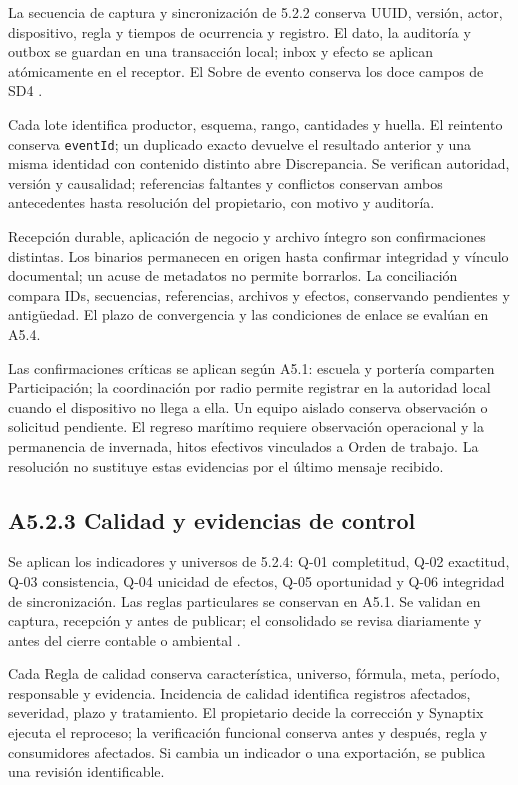 La secuencia de captura y sincronización de 5.2.2 conserva UUID, versión, actor, dispositivo, regla y tiempos de ocurrencia y registro. El dato, la auditoría y outbox se guardan en una transacción local; inbox y efecto se aplican atómicamente en el receptor. El Sobre de evento conserva los doce campos de SD4 \parencites[RT-05.03]{pucv-bases-transversales}{synaptix-sd4}.

Cada lote identifica productor, esquema, rango, cantidades y huella. El reintento conserva \texttt{eventId}; un duplicado exacto devuelve el resultado anterior y una misma identidad con contenido distinto abre Discrepancia. Se verifican autoridad, versión y causalidad; referencias faltantes y conflictos conservan ambos antecedentes hasta resolución del propietario, con motivo y auditoría.

Recepción durable, aplicación de negocio y archivo íntegro son confirmaciones distintas. Los binarios permanecen en origen hasta confirmar integridad y vínculo documental; un acuse de metadatos no permite borrarlos. La conciliación compara IDs, secuencias, referencias, archivos y efectos, conservando pendientes y antigüedad. El plazo de convergencia y las condiciones de enlace se evalúan en A5.4.

Las confirmaciones críticas se aplican según A5.1: escuela y portería comparten Participación; la coordinación por radio permite registrar en la autoridad local cuando el dispositivo no llega a ella. Un equipo aislado conserva observación o solicitud pendiente. El regreso marítimo requiere observación operacional y la permanencia de invernada, hitos efectivos vinculados a Orden de trabajo. La resolución no sustituye estas evidencias por el último mensaje recibido.

\subsection*{A5.2.3 Calidad y evidencias de control}

Se aplican los indicadores y universos de 5.2.4: Q-01 completitud, Q-02 exactitud, Q-03 consistencia, Q-04 unicidad de efectos, Q-05 oportunidad y Q-06 integridad de sincronización. Las reglas particulares se conservan en A5.1. Se validan en captura, recepción y antes de publicar; el consolidado se revisa diariamente y antes del cierre contable o ambiental \parencite[RT-05.04]{pucv-bases-transversales}.

Cada Regla de calidad conserva característica, universo, fórmula, meta, período, responsable y evidencia. Incidencia de calidad identifica registros afectados, severidad, plazo y tratamiento. El propietario decide la corrección y Synaptix ejecuta el reproceso; la verificación funcional conserva antes y después, regla y consumidores afectados. Si cambia un indicador o una exportación, se publica una revisión identificable.

